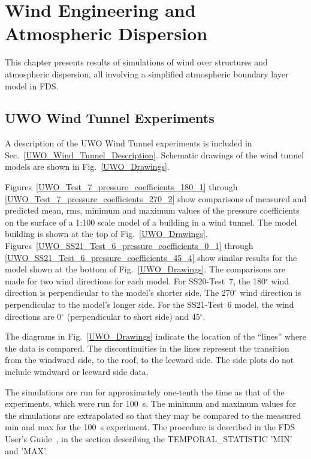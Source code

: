 
\chapter{Wind Engineering and Atmospheric Dispersion}

This chapter presents results of simulations of wind over structures and atmospheric dispersion, all involving a simplified atmospheric boundary layer model in FDS.


\section{UWO Wind Tunnel Experiments}

A description of the UWO Wind Tunnel experiments is included in Sec.~\ref{UWO_Wind_Tunnel_Description}. Schematic drawings of the wind tunnel models are shown in Fig.~\ref{UWO_Drawings}.

Figures~\ref{UWO_Test_7_pressure_coefficients_180_1} through \ref{UWO_Test_7_pressure_coefficients_270_2} show comparisons of measured and predicted mean, rms, minimum and maximum values of the pressure coefficients on the surface of a 1:100 scale model of a building in a wind tunnel. The model building is shown at the top of Fig.~\ref{UWO_Drawings}. Figures~\ref{UWO_SS21_Test_6_pressure_coefficients_0_1} through \ref{UWO_SS21_Test_6_pressure_coefficients_45_4} show similar results for the model shown at the bottom of Fig.~\ref{UWO_Drawings}. The comparisons are made for two wind directions for each model. For SS20-Test~7, the 180$^\circ$ wind direction is perpendicular to the model's shorter side. The 270$^\circ$ wind direction is perpendicular to the model's longer side. For the SS21-Test~6 model, the wind directions are 0$^\circ$ (perpendicular to short side) and 45$^\circ$.

The diagrams in Fig.~\ref{UWO_Drawings} indicate the location of the ``lines'' where the data is compared. The discontinuities in the lines represent the transition from the windward side, to the roof, to the leeward side. The side plots do not include windward or leeward side data.

The simulations are run for approximately one-tenth the time as that of the experiments, which were run for 100~s. The minimum and maximum values for the simulations are extrapolated so that they may be compared to the measured min and max for the 100~s experiment. The procedure is described in the FDS User's Guide~\cite{FDS_Users_Guide}, in the section describing the {\ct TEMPORAL\_STATISTIC} {\ct 'MIN'} and {\ct 'MAX'}.

